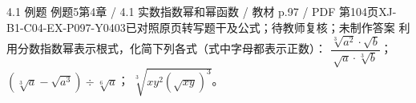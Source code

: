 \par\noindent\begin{minipage}{\linewidth}
\begin{bankitem}{4.1 例题 例题5}{第4章 / 4.1 实数指数幂和幂函数 / 教材 p.97 / PDF 第104页}{XJ-B1-C04-EX-P097-Y0403}{已对照原页转写题干及公式；待教师复核；未制作答案}
利用分数指数幂表示根式，化简下列各式（式中字母都表示正数）：
$\dfrac{\sqrt[3]{a^2}\cdot\sqrt b}{\sqrt a\cdot\sqrt[3]b}$；
$\left(\sqrt[3]a-\sqrt{a^3}\right)\div\sqrt[6]a$；
$\sqrt[3]{xy^2\left(\sqrt{xy}\right)^3}$。
\end{bankitem}
\end{minipage}\par\medskip
